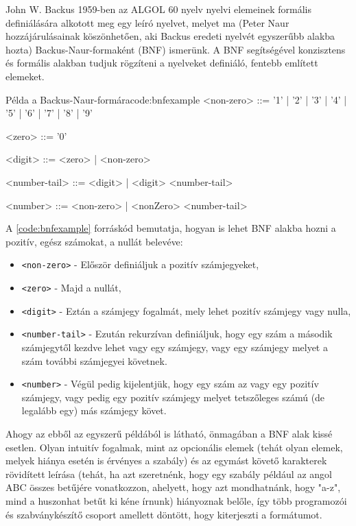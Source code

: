 John W. Backus 1959-ben az ALGOL 60 nyelv nyelvi elemeinek formális definiálására alkotott meg egy leíró nyelvet\cite{bnf}, melyet ma (Peter Naur hozzájárulásainak köszönhetően, aki Backus eredeti nyelvét egyszerűbb alakba hozta) Backus-Naur-formaként (BNF) ismerünk. A BNF segítségével konzisztens és formális alakban tudjuk rögzíteni a nyelveket definiáló, fentebb említett elemeket.

\begin{code}{Példa a Backus-Naur-formára}{code:bnfexample}
<non-zero> ::= '1' | '2' | '3' 
            | '4' | '5' | '6' 
            | '7' | '8' | '9'

<zero> ::= '0'

<digit> ::= <zero> | <non-zero>

<number-tail> ::= <digit> | <digit> <number-tail>

<number> ::= <non-zero> | <nonZero> <number-tail> 
\end{code}

A \ref{code:bnfexample} forráskód bemutatja, hogyan is lehet BNF alakba hozni a pozitív, egész számokat, a nullát belevéve: 

\begin{itemize}
  \item \texttt{<non-zero>} - Először definiáljuk a pozitív számjegyeket,
  \item \texttt{<zero>} - Majd a nullát, 
  \item \texttt{<digit>} - Eztán a számjegy fogalmát, mely lehet pozitív számjegy vagy nulla,
  \item \texttt{<number-tail>} - Ezután rekurzívan definiáljuk, hogy egy szám a második számjegytől kezdve lehet vagy egy számjegy, vagy egy számjegy melyet a szám további számjegyei követnek. 
  \item \texttt{<number>} - Végül pedig kijelentjük, hogy egy szám az vagy egy pozitív számjegy, vagy pedig egy pozitív számjegy melyet tetszőleges számú (de legalább egy) más számjegy követ.
\end{itemize}

Ahogy az ebből az egyszerű példából is látható, önmagában a BNF alak kissé esetlen. Olyan intuitív fogalmak, mint az opcionális elemek (tehát olyan elemek, melyek hiánya esetén is érvényes a szabály) és az egymást követő karakterek rövidített leírása (tehát, ha azt szeretnénk, hogy egy szabály például az angol ABC összes betűjére vonatkozzon, ahelyett, hogy azt mondhatnánk, hogy "a-z", mind a huszonhat betűt ki kéne írnunk) hiányoznak belőle, így több programozói és szabványkészítő csoport amellett döntött, hogy kiterjeszti a formátumot.

